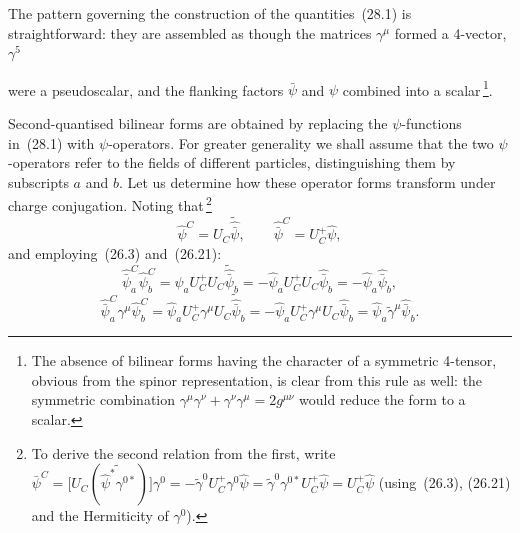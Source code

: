 The pattern governing the construction of the quantities~(28.1) is straightforward: they are assembled as though the matrices $\gamma^\mu$ formed a 4-vector, $\gamma^5$

were a pseudoscalar, and the flanking factors $\bar\psi$ and $\psi$ combined into a scalar\,\footnote{The absence of bilinear forms having the character of a symmetric 4-tensor, obvious from the spinor representation, is clear from this rule as well: the symmetric combination $\gamma^\mu\gamma^\nu + \gamma^\nu\gamma^\mu = 2g^{\mu\nu}$ would reduce the form to a scalar.}.

Second-quantised bilinear forms are obtained by replacing the $\psi$-functions in~(28.1) with $\psi$-operators. For greater generality we shall assume that the two $\psi$-operators refer to the fields of different particles, distinguishing them by subscripts $a$ and $b$. Let us determine how these operator forms transform under charge conjugation. Noting that\,\footnote{To derive the second relation from the first, write
$\bar\psi^C = \bigl[U_C(\widetilde{\widehat\psi^*\gamma^{0*}})\bigr]\gamma^0 = -\widetilde\gamma^0 U_C^+\gamma^0\widehat\psi = \widetilde\gamma^0\gamma^{0*}U_C^+\widehat\psi = U_C^+\widehat\psi$
(using~(26.3), (26.21) and the Hermiticity of $\gamma^0$).}
\begin{equation}
\widehat\psi^C = U_C\widetilde{\widehat{\bar\psi}},\qquad \widehat{\bar\psi}^C = U_C^+\widehat\psi,
\tag{28.3}
\end{equation}
and employing~(26.3) and~(26.21):
\[
\widehat{\bar\psi}^C_a\widehat\psi^C_b = \widehat\psi_a U_C^+ U_C\widetilde{\widehat{\bar\psi}}_b = -\widehat\psi_a U_C^+ U_C\widehat{\bar\psi}_b = -\widehat\psi_a\widehat{\bar\psi}_b,
\]
\[
\widehat{\bar\psi}^C_a\gamma^\mu\widehat\psi^C_b = \widehat\psi_a U_C^+\gamma^\mu U_C\widetilde{\widehat{\bar\psi}}_b = -\widehat\psi_a U_C^+\gamma^\mu U_C\widehat{\bar\psi}_b = \widehat\psi_a\widetilde\gamma^\mu\widehat{\bar\psi}_b.
\]

